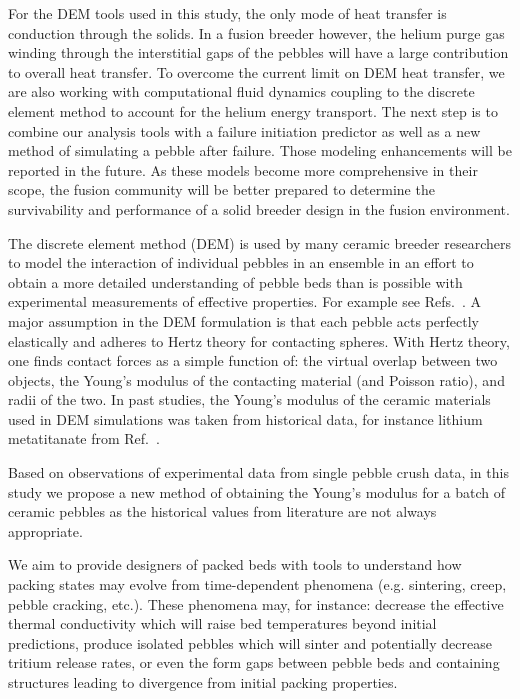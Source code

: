 For the DEM tools used in this study, the only mode of heat transfer is conduction through the solids. In a fusion breeder however, the helium purge gas winding through the interstitial gaps of the pebbles will have a large contribution to overall heat transfer\cite{Reimann:2002mi,Abou-Sena2005}. To overcome the current limit on DEM heat transfer, we are also working with computational fluid dynamics coupling to the discrete element method to account for the helium energy transport. The next step is to combine our analysis tools with a failure initiation predictor as well as a new method of simulating a pebble after failure. Those modeling enhancements will be reported in the future. As these models become more comprehensive in their scope, the fusion community will be better prepared to determine the survivability and performance of a solid breeder design in the fusion environment.


The discrete element method (DEM) is used by many ceramic breeder researchers to model the interaction of individual pebbles in an ensemble in an effort to obtain a more detailed understanding of pebble beds than is possible with experimental measurements of effective properties. For example see Refs.~\cite{An20071393, Lu2000, Zhao2010, Gan2010a, Annabattula2012a, VanLew2014}. A major assumption in the DEM formulation is that each pebble acts perfectly elastically and adheres to Hertz theory for contacting spheres. With Hertz theory, one finds contact forces as a simple function of: the virtual overlap between two objects, the Young's modulus of the contacting material (and Poisson ratio), and radii of the two. In past studies, the Young's modulus of the ceramic materials  used in DEM simulations was taken from historical data, for instance lithium metatitanate from Ref.~\cite{Gierszewski1998}.

Based on observations of experimental data from single pebble crush data, in this study we propose a new method of obtaining the Young's modulus for a batch of ceramic pebbles as the historical values from literature are not always appropriate.


We aim to provide designers of packed beds with tools to understand how packing states may evolve from time-dependent phenomena (e.g. sintering, creep, pebble cracking, etc.). These phenomena may, for instance: decrease the effective thermal conductivity which will raise bed temperatures beyond initial predictions, produce isolated pebbles which will sinter and potentially decrease tritium release rates, or even the form gaps between pebble beds and containing structures leading to divergence from initial packing properties. 

